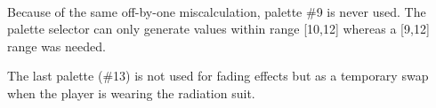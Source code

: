 \\
\par
Because of the same off-by-one miscalculation, palette \#9 is never used. The palette selector can only generate values within range [10,12] whereas a [9,12] range was needed.\\
\par
\par
The last palette (\#13) is not used for fading effects but as a temporary swap when the player is wearing the radiation suit.\\ 
\par

